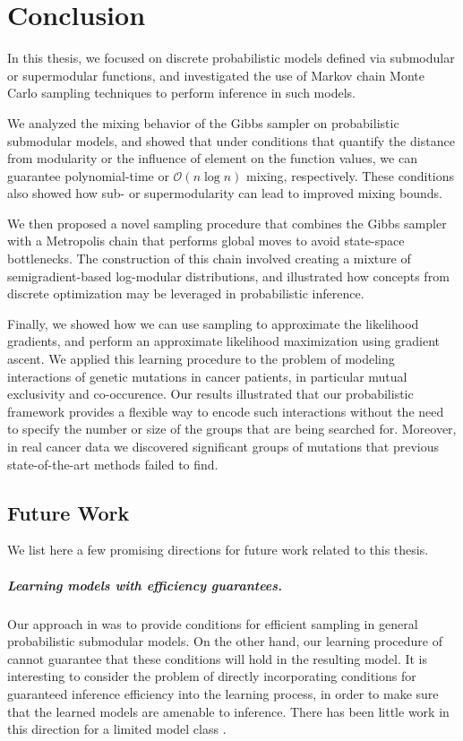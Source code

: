 \chapter{Conclusion} \label{ch:conclusion}

In this thesis, we focused on discrete probabilistic models defined via submodular or supermodular functions, and investigated the use of Markov chain Monte Carlo sampling techniques to perform inference in such models.

We analyzed the mixing behavior of the Gibbs sampler on probabilistic submodular models, and showed that under conditions that quantify the distance from modularity or the influence of element on the function values, we can guarantee polynomial-time or $\mathcal{O}(n\log n)$ mixing, respectively.
These conditions also showed how sub- or supermodularity can lead to improved mixing bounds.

We then proposed a novel sampling procedure that combines the Gibbs sampler with a Metropolis chain that performs global moves to avoid state-space bottlenecks.
The construction of this chain involved creating a mixture of semigradient-based log-modular distributions, and illustrated how concepts from discrete optimization may be leveraged in probabilistic inference.

Finally, we showed how we can use sampling to approximate the likelihood gradients, and perform an approximate likelihood maximization using gradient ascent.
We applied this learning procedure to the problem of modeling interactions of genetic mutations in cancer patients, in particular mutual exclusivity and co-occurence.
Our results illustrated that our probabilistic framework provides a flexible way to encode such interactions without the need to specify the number or size of the groups that are being searched for.
Moreover, in real cancer data we discovered significant groups of mutations that previous state-of-the-art methods failed to find.

\section{Future Work}
We list here a few promising directions for future work related to this thesis.

\paragraph{Learning models with efficiency guarantees.}
Our approach in  was to provide conditions for efficient sampling in general probabilistic submodular models.
On the other hand, our learning procedure of  cannot guarantee that these conditions will hold in the resulting model.
It is interesting to consider the problem of directly incorporating conditions for guaranteed inference efficiency into the learning process, in order to make sure that the learned models are amenable to inference.
There has been little work in this direction for a limited model class \citep{domke15}.

